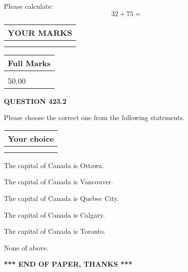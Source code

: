 \documentclass[12pt]{article}
\begin{document}
  
 
Please calculate:
\begin{equation}
32 +  %
75 = \nonumber
\end{equation}
 

 

 
  
\vspace{0.2in}
  
\noindent\begin{tabular}{|l|}
\hline
 YOUR MARKS  \\
\hline
 \\ 
 \\ 
\hline
\end{tabular}
\hspace{0.05in} \begin{tabular}{|l|}
\hline
 Full Marks  \\
\hline
 \\ 
50.00 \\
\hline
\end{tabular}
{\textbf{\Large{QUESTION
423.2 
}}}
  
  
Please choose the correct one from the following statements.
  
  
\noindent\hspace{3.0in} \begin{tabular}{|l|}
\hline
Your choice \\
\hline
 \\ 
 \\ 
\hline
\end{tabular}
  
  
 
 
The capital of Canada is Ottawa.
 
 
The capital of Canada is Vancouver.
 
 
The capital of Canada is Quebec City.
 
 
The capital of Canada is Calgary.
 
 
The capital of Canada is Toronto.
 
 
 None of above.
 
 
   
   
 \vspace{0.2in}
 
   
   
   
   
\vspace{1.0in} 
{\textbf{\large{ *** END OF PAPER, THANKS *** }}} 
   
\end{document}
